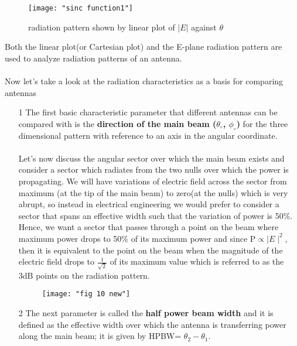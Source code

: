 \begin{figure}[h]
	\centering
	\texttt{[image: "sinc function1"]}
	\caption{radiation pattern shown by linear plot of $|E|$ against $\theta$}
	\label{figure9}
	\end{figure}

Both the linear plot(or Cartesian plot) and the E-plane radiation pattern are used to analyze radiation patterns of an antenna.\\\\
Now let's take a look at the radiation characteristics as a basis for comparing antennas
\begin{enumerate}
	\item[1]The first basic characteristic parameter that different antennas can be compared with is the \textbf{direction of the main beam ($\theta_\circ$, $\phi_\circ$)} for the three dimensional pattern with reference to an axis in the angular coordinate.
	\paragraph{}
	Let's now discuss the angular sector over which the main beam exists and consider a sector which radiates from the two nulls over which the power is propagating. We will have variations of electric field across the sector from maximum (at the tip of the main beam) to zero(at the nulls) which is very abrupt, so instead in electrical engineering we would prefer to consider a sector that spans an effective width such that the variation of power is 50\%. Hence, we want a sector that passes through a point on the beam where maximum power drops to 50\% of its maximum power and since P$\propto \mid E\mid^{2}$, then it is equivalent to the point on the beam when the magnitude of the electric field drops to $\frac{1}{\sqrt{2}}$ of its maximum value which is referred to as the 3dB points on the radiation pattern.
	
\begin{figure}[h]
	\centering
	\texttt{[image: "fig 10 new"]}
	\label{figure10}
\end{figure}
	

	\item[2]The next parameter is called the \textbf{half power beam width} and it is defined as the effective width over which the antenna is transferring power along the main beam; it is given by HPBW= $\theta_2 -\theta_1$.

\end{enumerate}
